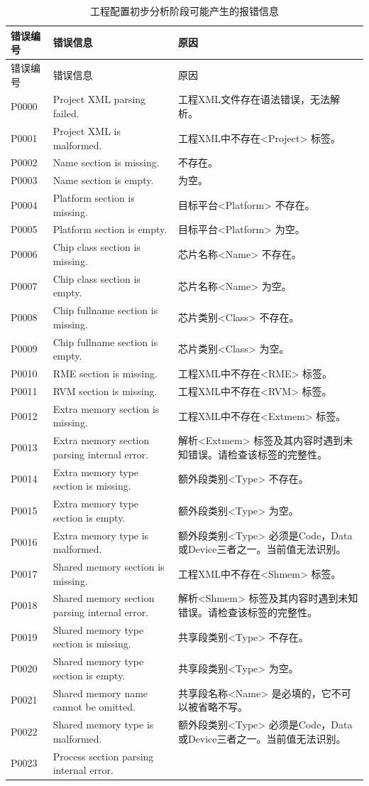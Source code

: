 \begin{xltabular}{\textwidth}{@{}>{\hsize\raggedright\arraybackslash}X>{\hsize\raggedright\arraybackslash}X>{\hsize\raggedright\arraybackslash}X@{}}
\caption{工程配置初步分析阶段可能产生的报错信息}\label{tab:5-3}\\
\toprule
错误编号 & 错误信息 & 原因\tabularnewline
\endfirsthead
\toprule
错误编号 & 错误信息 & 原因\tabularnewline
\midrule
\endhead
\bottomrule
\endlastfoot
P0000 & Project XML parsing failed. &
工程XML文件存在语法错误，无法解析。\tabularnewline
P0001 & Project XML is malformed. &
工程XML中不存在<Project> 标签。\tabularnewline
P0002 & Name section is missing. & 不存在。\tabularnewline
P0003 & Name section is empty. & 为空。\tabularnewline
P0004 & Platform section is missing. &
目标平台<Platform> 不存在。\tabularnewline
P0005 & Platform section is empty. &
目标平台<Platform> 为空。\tabularnewline
P0006 & Chip class section is missing. &
芯片名称<Name> 不存在。\tabularnewline
P0007 & Chip class section is empty. &
芯片名称<Name> 为空。\tabularnewline
P0008 & Chip fullname section is missing. &
芯片类别<Class> 不存在。\tabularnewline
P0009 & Chip fullname section is empty. &
芯片类别<Class> 为空。\tabularnewline
P0010 & RME section is missing. &
工程XML中不存在<RME> 标签。\tabularnewline
P0011 & RVM section is missing. &
工程XML中不存在<RVM> 标签。\tabularnewline
P0012 & Extra memory section is missing. &
工程XML中不存在<Extmem> 标签。\tabularnewline
P0013 & Extra memory section parsing internal error. &
解析<Extmem> 标签及其内容时遇到未知错误。请检查该标签的完整性。\tabularnewline
P0014 & Extra memory type section is missing. &
额外段类别<Type> 不存在。\tabularnewline
P0015 & Extra memory type section is empty. &
额外段类别<Type> 为空。\tabularnewline
P0016 & Extra memory type is malformed. &
额外段类别<Type> 必须是Code，Data或Device三者之一。当前值无法识别。\tabularnewline
P0017 & Shared memory section is missing. &
工程XML中不存在<Shmem> 标签。\tabularnewline
P0018 & Shared memory section parsing internal error. &
解析<Shmem> 标签及其内容时遇到未知错误。请检查该标签的完整性。\tabularnewline
P0019 & Shared memory type section is missing. &
共享段类别<Type> 不存在。\tabularnewline
P0020 & Shared memory type section is empty. &
共享段类别<Type> 为空。\tabularnewline
P0021 & Shared memory name cannot be omitted. &
共享段名称<Name> 是必填的，它不可以被省略不写。\tabularnewline
P0022 & Shared memory type is malformed. &
额外段类别<Type> 必须是Code，Data或Device三者之一。当前值无法识别。\tabularnewline
P0023 & Process section parsing internal error. &

\end{xltabular}
